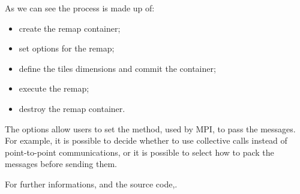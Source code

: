 As we can see the process is made up of:
\begin{itemize}
\item create the remap container;
\item set options for the remap;
\item define the tiles dimensions and commit the container;
\item execute the remap;
\item destroy the remap container.
\end{itemize}
\par
The options allow users to set the method, used by MPI, to pass the messages. For example, it is possible to decide whether to use collective calls instead of point-to-point communications, or it is possible to select how to pack the messages before sending them.
\par
For further informations, and the source code,\cite{fftMPI}.


